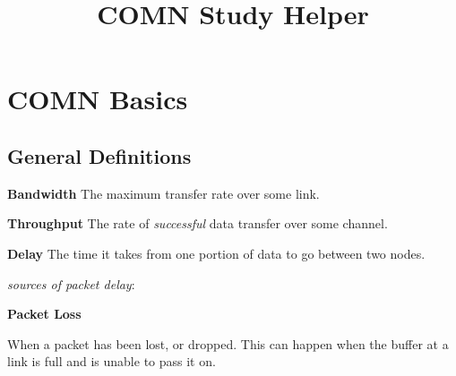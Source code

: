 \documentclass{article}
\begin{document}
\title{COMN Study Helper}
\date{}
\maketitle
\pagestyle{empty}

\section{COMN Basics}
\subsection{General Definitions}

\textbf{Bandwidth}
The maximum transfer rate over some link.

\textbf{Throughput}
The rate of \textit{successful} data transfer over some channel.

\textbf{Delay}
The time it takes from one portion of data to go between two nodes.

\textit{sources of packet delay}:


\textbf{Packet Loss}

When a packet has been lost, or dropped. This can happen when the buffer at a link is full and is unable to pass it on.
\end{document}
